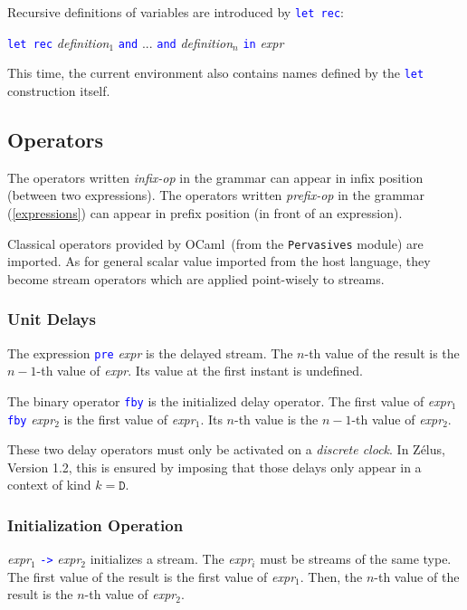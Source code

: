 \documentclass[11pt,titlepage,twoside]{report}
\newcommand{\zelus}{{\sf Z\'elus}}
\newcommand{\ocaml}{{\sf OCaml}}
\newcommand{\Let}{\mbox{{\tt let}}}
\newcommand{\Rec}{\mbox{{\tt rec}}}
\newcommand{\In}{\mbox{{\tt in}}}
\newcommand{\AND}{\mbox{{\tt and}}}
\newcommand{\Pre}{\mbox{{\tt pre}}}
\newcommand{\Fby}{\mbox{{\tt fby}}}
\newcommand{\Minusgreater}{\mbox{{\tt ->}}}
\newcommand{\term}[1]{\textcolor{Blue}{\tt #1}}
\newcommand{\nterm}[1]{\textcolor{BrickRed}{\it #1}}
\newcommand{\term}[1]{{\tt #1}}
\newcommand{\nterm}[1]{{\em #1}}
\newcommand{\NodeKind}{\ensuremath{\mathtt{D}}}
\begin{document}
Recursive definitions of variables are introduced by \term{\Let\ \Rec}:
\begin{center}
  \term{\Let\ \Rec} \nterm{definition}$_1$ \term{\AND} ... 
  \term{\AND} \nterm{definition}$_n$ \term{\In} \nterm{expr}
\end{center}

This time, the current environment also contains names defined by the \term{\Let}
construction itself.

\subsection{Operators\label{operators}} %

The operators written \nterm{infix-op} in the grammar can appear in
infix position (between two expressions). The operators written
\nterm{prefix-op} in the grammar (\cref{expressions}) can appear
in prefix position (in front of an expression).

Classical operators provided by \ocaml\ (from the {\tt Pervasives}
module) are imported. As for general scalar value imported from the
host language, they become stream operators which are applied
point-wisely to streams.

\subsubsection{Unit Delays} %

The expression \term{\Pre} \nterm{expr} is the delayed
stream. The $n$-th value of the result is the $n-1$-th
value of \nterm{expr}. Its value at the first instant is undefined.

The binary operator \term{\Fby} is the initialized delay operator. The
first value of \nterm{expr}$_1$ \term{\Fby} \nterm{expr}$_2$ is the
first value of \nterm{expr}$_1$. Its $n$-th value is the $n-1$-th
value of \nterm{expr}$_2$.

These two delay operators must only be activated on a \emph{discrete clock}. In
\zelus, Version 1.2, this is ensured by imposing that those delays only
appear in a context of kind $k = \NodeKind$.

\subsubsection{Initialization Operation} %

\nterm{expr}$_1$ \term{\Minusgreater} \nterm{expr}$_2$ initializes a
stream. The \nterm{expr}$_i$ must be streams of the same type. The
first value of the result is the first value of
\nterm{expr}$_1$. Then, the $n$-th value of the result is the $n$-th
value of \nterm{expr}$_2$.
\end{document}
